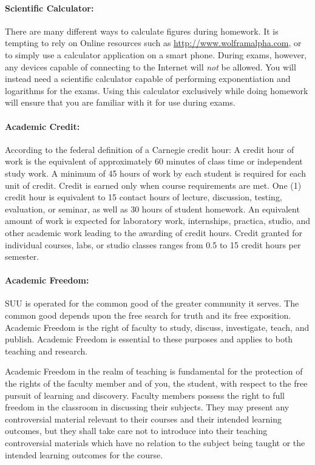 \documentclass[12pt, letterpaper]{article}
\begin{document}
\paragraph{Scientific Calculator:}
There are many different ways to calculate figures during homework. It is tempting to rely on Online resources such as \href{http://www.wolframalpha.com}{http://www.wolframalpha.com}, or to simply use a calculator application on a smart phone. During exams, however, any devices capable of connecting to the Internet will \emph{not} be allowed. You will instead need a scientific calculator capable of performing exponentiation and logarithms for the exams. Using this calculator exclusively while doing homework will ensure that you are familiar with it for use during exams.

\paragraph{Academic Credit:}
According to the federal definition of a Carnegie credit hour: A credit hour of work is the equivalent of approximately 60 minutes of class time or independent study work. A minimum of 45 hours of work by each student is required for each unit of credit. Credit is earned only when course requirements are met. One (1) credit hour is equivalent to 15 contact hours of lecture, discussion, testing, evaluation, or seminar, as well as 30 hours of student homework. An equivalent amount of work is expected for laboratory work, internships, practica, studio, and other academic work leading to the awarding of credit hours. Credit granted for individual courses, labs, or studio classes ranges from 0.5 to 15 credit hours per semester.

\paragraph{Academic Freedom:}
SUU is operated for the common good of the greater community it serves. The common good depends upon the free search for truth and its free exposition. Academic Freedom is the right of faculty to study, discuss, investigate, teach, and publish. Academic Freedom is essential to these purposes and applies to both teaching and research. 

\noindent Academic Freedom in the realm of teaching is fundamental for the protection of the rights of the faculty member and of you, the student, with respect to the free pursuit of learning and discovery. Faculty members possess the right to full freedom in the classroom in discussing their subjects. They may present any controversial material relevant to their courses and their intended learning outcomes, but they shall take care not to introduce into their teaching controversial materials which have no relation to the subject being taught or the intended learning outcomes for the course.
\end{document}
